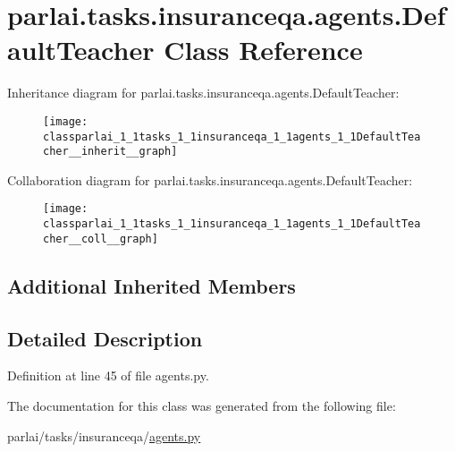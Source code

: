 \hypertarget{classparlai_1_1tasks_1_1insuranceqa_1_1agents_1_1DefaultTeacher}{}\section{parlai.\+tasks.\+insuranceqa.\+agents.\+Default\+Teacher Class Reference}
\label{classparlai_1_1tasks_1_1insuranceqa_1_1agents_1_1DefaultTeacher}


Inheritance diagram for parlai.\+tasks.\+insuranceqa.\+agents.\+Default\+Teacher\+:
\nopagebreak
\begin{figure}[H]
\begin{center}
\leavevmode
\texttt{[image: classparlai\_1\_1tasks\_1\_1insuranceqa\_1\_1agents\_1\_1DefaultTeacher\_\_inherit\_\_graph]}
\end{center}
\end{figure}


Collaboration diagram for parlai.\+tasks.\+insuranceqa.\+agents.\+Default\+Teacher\+:
\nopagebreak
\begin{figure}[H]
\begin{center}
\leavevmode
\texttt{[image: classparlai\_1\_1tasks\_1\_1insuranceqa\_1\_1agents\_1\_1DefaultTeacher\_\_coll\_\_graph]}
\end{center}
\end{figure}
\subsection*{Additional Inherited Members}


\subsection{Detailed Description}


Definition at line 45 of file agents.\+py.



The documentation for this class was generated from the following file\+:\begin{DoxyCompactItemize}
\item 
parlai/tasks/insuranceqa/\hyperlink{parlai_2tasks_2insuranceqa_2agents_8py}{agents.\+py}\end{DoxyCompactItemize}
